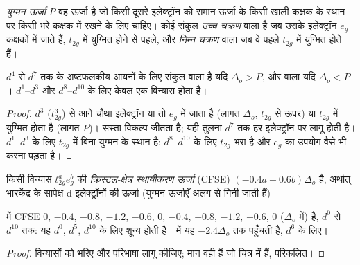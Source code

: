 \begin{definition}[चक्रण अवस्थाएँ]\label{def:b2:ligand-field:spin}
\emph{युग्मन ऊर्जा} $P$ वह ऊर्जा है जो किसी दूसरे
इलेक्ट्रॉन को समान ऊर्जा के किसी खाली कक्षक के स्थान पर किसी भरे कक्षक में रखने के लिए चाहिए। कोई
संकुल \emph{उच्च चक्रण} वाला है जब उसके इलेक्ट्रॉन $e_g$ कक्षकों में जाते हैं,
$t_{2g}$ में युग्मित होने से पहले, और \emph{निम्न चक्रण} वाला जब वे पहले
$t_{2g}$ में युग्मित होते हैं।
\end{definition}

\begin{proposition}\label{prop:b2:ligand-field:spin-state}
$d^4$ से $d^7$ तक के अष्टफलकीय आयनों के लिए संकुल  वाला है यदि $\Delta_o > P$, और  वाला
यदि $\Delta_o < P$। $d^1$--$d^3$ और $d^8$--$d^{10}$ के लिए केवल एक विन्यास होता है।
\end{proposition}

\begin{proof}
$d^3$ ($t_{2g}^3$) से आगे चौथा इलेक्ट्रॉन या तो $e_g$ में जाता है (लागत $\Delta_o$,
$t_{2g}$ से ऊपर) या $t_{2g}$ में युग्मित होता है (लागत $P$)। सस्ता विकल्प जीतता है; यही तुलना
$d^7$ तक हर इलेक्ट्रॉन पर लागू होती है। $d^1$--$d^3$ के लिए $t_{2g}$ में बिना युग्मन के स्थान है;
$d^8$--$d^{10}$ के लिए $t_{2g}$ भरा है और $e_g$ का उपयोग वैसे भी करना पड़ता है।
\end{proof}

\begin{definition}[क्रिस्टल-क्षेत्र स्थायीकरण ऊर्जा]\label{def:b2:ligand-field:cfse}
किसी विन्यास $t_{2g}^ae_g^b$ की \emph{क्रिस्टल-क्षेत्र स्थायीकरण ऊर्जा}
(CFSE) $(-0.4a + 0.6b)\Delta_o$ है, अर्थात् भारकेंद्र के सापेक्ष
d इलेक्ट्रॉनों की ऊर्जा (युग्मन ऊर्जाएँ अलग से गिनी जाती हैं)।
\end{definition}

\begin{proposition}[श्रेणी के अनुदिश CFSE]\label{prop:b2:ligand-field:cfse}
 में CFSE $0$, $-0.4$, $-0.8$, $-1.2$, $-0.6$, $0$, $-0.4$, $-0.8$, $-1.2$,
$-0.6$, $0$ ($\Delta_o$ में) है, $d^0$ से $d^{10}$ तक: यह $d^0$, $d^5$, $d^{10}$ के लिए शून्य होती है।  में यह $-2.4\Delta_o$ तक पहुँचती है, $d^6$ के लिए।
\end{proposition}

\begin{proof}
विन्यासों को भरिए और परिभाषा लागू कीजिए; मान वही हैं जो चित्र में हैं,
परिकलित।
\end{proof}

